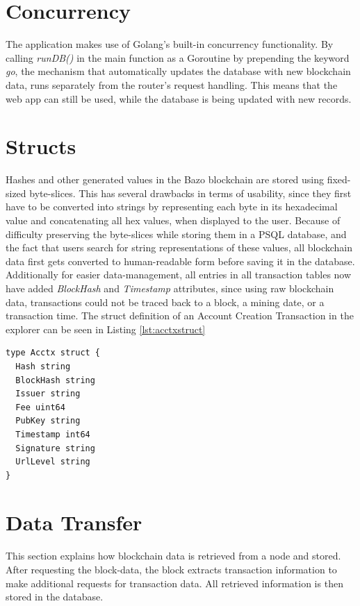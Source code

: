 \section{Concurrency} \label{goroutines}
The application makes use of Golang's built-in concurrency functionality. By calling \emph{runDB()} in the main function as a Goroutine by prepending the keyword \emph{go}, the mechanism that automatically updates the database with new blockchain data, runs separately from the router's request handling. This means that the web app can still be used, while the database is being updated with new records.

\section{Structs}
Hashes and other generated values in the Bazo blockchain are stored using fixed-sized byte-slices. This has several drawbacks in terms of usability, since they first have to be converted into strings by representing each byte in its hexadecimal value and concatenating all hex values, when displayed to the user. Because of difficulty preserving the byte-slices while storing them in a PSQL database, and the fact that users search for string representations of these values, all blockchain data first gets converted to human-readable form before saving it in the database. Additionally for easier data-management, all entries in all transaction tables now have added \emph{BlockHash} and \emph{Timestamp} attributes, since using raw blockchain data, transactions could not be traced back to a block, a mining date, or a transaction time. The struct definition of an Account Creation Transaction in the explorer can be seen in Listing \ref{lst:acctxstruct}

\begin{lstlisting}[caption={Struct Definition of an Account Cration Transaction},captionpos=b,label={lst:acctxstruct}]
type Acctx struct {
  Hash string
  BlockHash string
  Issuer string
  Fee uint64
  PubKey string
  Timestamp int64
  Signature string
  UrlLevel string
}
\end{lstlisting}
\section{Data Transfer} \label{data}
This section explains how blockchain data is retrieved from a node and stored. After requesting the block-data, the block extracts transaction information to make additional requests for transaction data. All retrieved information is then stored in the database.
